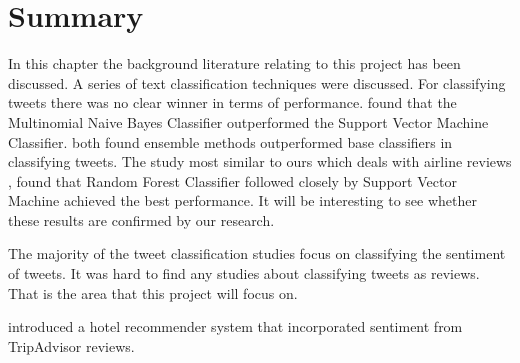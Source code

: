 
\section{Summary}


In this chapter the background literature relating to this project has been discussed. A series of text classification techniques were discussed. For classifying tweets there was no clear winner in terms of performance. \cite{Berm2010} found that the Multinomial Naive Bayes Classifier outperformed the Support Vector Machine Classifier. \cite{Ankit2018,Kanakaraj2015} both found ensemble methods outperformed base classifiers in classifying tweets. The study most similar to ours which deals with airline reviews \cite{Rane2018}, found that Random Forest Classifier followed closely by Support Vector Machine achieved the best performance. It will be interesting to see whether these results are confirmed by our research.

The majority of the tweet classification studies focus on classifying the sentiment of tweets. It was hard to find any studies about classifying tweets as reviews. That is the area that this project will focus on. 

\cite{levi2012} introduced a hotel recommender system that incorporated sentiment from TripAdvisor reviews. 



